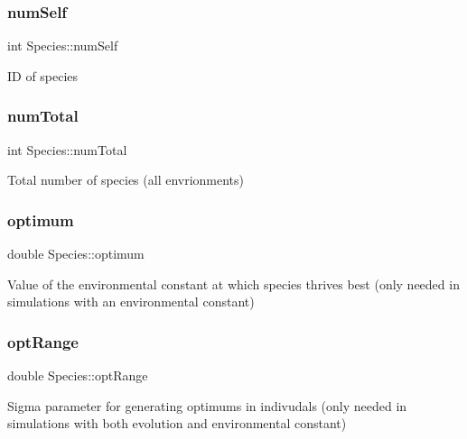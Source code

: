 \subsubsection{\texorpdfstring{num\+Self}{numSelf}}
{\footnotesize\ttfamily int Species\+::num\+Self\hspace{0.3cm}{\ttfamily [protected]}}

ID of species \mbox{\label{classSpecies_af13ccb1fc01cff22d7a47201c1002fbc}} 
\subsubsection{\texorpdfstring{num\+Total}{numTotal}}
{\footnotesize\ttfamily int Species\+::num\+Total\hspace{0.3cm}{\ttfamily [protected]}}

Total number of species (all envrionments) \mbox{\label{classSpecies_a234d375e63c9be61d756b7e70d7d9397}} 
\subsubsection{\texorpdfstring{optimum}{optimum}}
{\footnotesize\ttfamily double Species\+::optimum\hspace{0.3cm}{\ttfamily [protected]}}

Value of the environmental constant at which species thrives best (only needed in simulations with an environmental constant) \mbox{\label{classSpecies_ab7103281892ef74944f3f10df5ecbe69}} 
\subsubsection{\texorpdfstring{opt\+Range}{optRange}}
{\footnotesize\ttfamily double Species\+::opt\+Range\hspace{0.3cm}{\ttfamily [protected]}}

Sigma parameter for generating optimums in indivudals (only needed in simulations with both evolution and environmental constant) \mbox{\label{classSpecies_a46b0370ca3501bdcec53545df9f44cf4}} 
